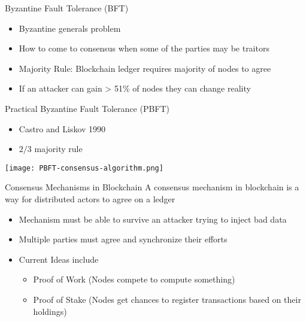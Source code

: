 \begin{withoutheadline}
\begin{frame}{Byzantine Fault Tolerance (BFT)}
    \begin{itemize}
        \item Byzantine generals problem
        \item How to come to consensus when some of the parties may be traitors
        \item Majority Rule: Blockchain ledger requires majority of nodes to agree
        \item If an attacker can gain > 51\% of nodes they can change reality
    \end{itemize}
\end{frame}

\begin{frame}{Practical Byzantine Fault Tolerance (PBFT)}
    \begin{itemize}
        \item Castro and Liskov 1990 %
        \item $2/3$ majority rule
    \end{itemize}
    \texttt{[image: PBFT-consensus-algorithm.png]}
\end{frame}

\begin{frame}{Consensus Mechanisms in Blockchain}
    A consensus mechanism in blockchain is a way for distributed actors to agree on a ledger
    \begin{itemize}
        \item Mechanism must be able to survive an attacker trying to inject bad data
        \item Multiple parties must agree and synchronize their efforts
        \item Current Ideas include
        \begin{itemize}
            \item Proof of Work (Nodes compete to compute something)
            \item Proof of Stake (Nodes get chances to register transactions based on their holdings)
        \end{itemize}
    \end{itemize}
\end{frame}


\end{withoutheadline}
